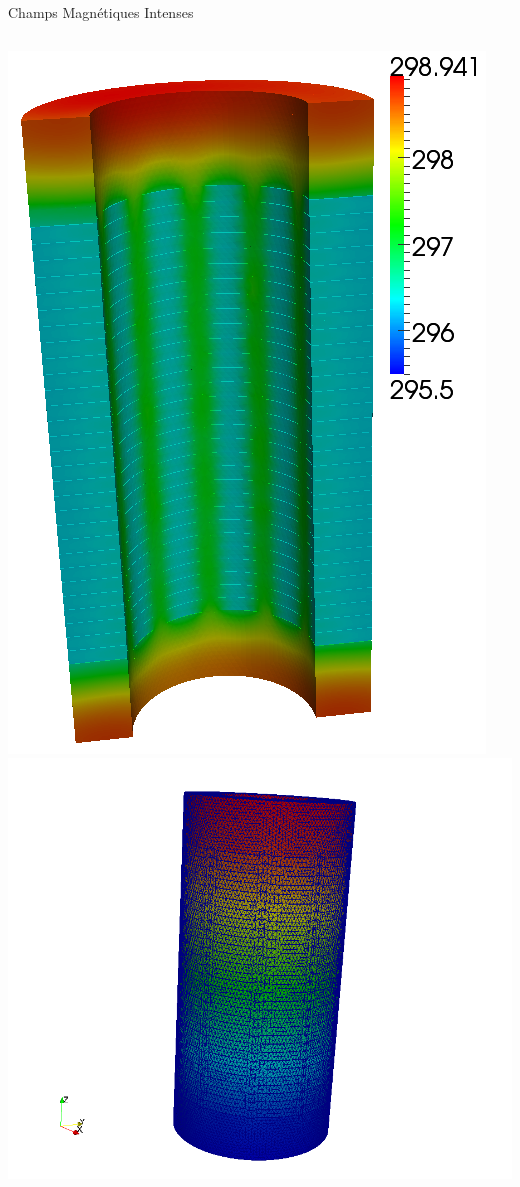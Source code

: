 \begin{frame}{Champs Magnétiques Intenses}
\begin{columns}[c]
      \includegraphics[height=.5\textheight]{Figures/cmi/temperature_HR_Bosse_cut1.png}
      \includegraphics[height=.5\textheight]{Figures/cmi/potentiel_HR_Bosse_mesh1.png}
    \end{columns}

\end{frame}

